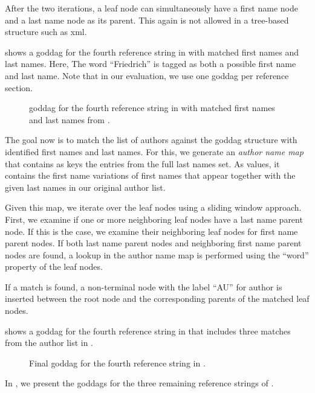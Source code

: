 After the two iterations, a leaf node can simultaneously have a first name node and a last name node as its parent.
This again is not allowed in a tree-based structure such as \gls{xml}.

 shows a \gls{goddag} for the fourth reference string in  with matched first names and last names.
Here, The word ``Friedrich'' is tagged as both a possible first name and last name.
Note that in our evaluation, we use one \gls{goddag} per reference section.
\begin{figure}[t]
  \centering
\resizebox{\linewidth}{!}{%
  
}
\caption{\gls{goddag} for the fourth reference string in  with matched first names and last names from .}
\label{fig:example-goddag-4-names}
\end{figure}

\bigskip

The goal now is to match the list of authors against the \gls{goddag} structure with identified first names and last names.
For this, we generate an \textit{author name map} that contains as keys the entries from the full last names set.
As values, it contains the first name variations of first names that appear together with the given last names in our original author list.

Given this map, we iterate over the leaf nodes using a sliding window approach.
First, we examine if one or more neighboring leaf nodes have a last name parent node.
If this is the case, we examine their neighboring leaf nodes for first name parent nodes.
If both last name parent nodes and neighboring first name parent nodes are found, a lookup in the author name map is performed using the ``word'' property of the leaf nodes.

If a match is found, a non-terminal node with the label ``AU'' for author is inserted between the root node and the corresponding parents of the matched leaf nodes.

 shows a \gls{goddag} for the fourth reference string in  that includes three matches from the author list in .
\begin{figure}[t]
  \centering
\resizebox{\linewidth}{!}{%
  
}
\caption{Final \gls{goddag} for the fourth reference string in .}
\label{fig:example-goddag-4-final}
\end{figure}
In , we present the \glspl{goddag} for the three remaining reference strings of .

